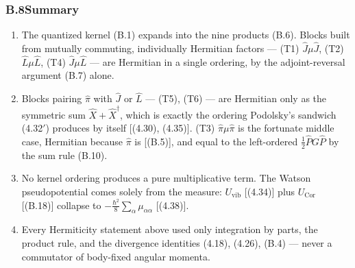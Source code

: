 \subsubsection*{B.8\quad Summary}

\begin{enumerate}
\item The quantized kernel (B.1) expands into the nine products (B.6). Blocks built from mutually commuting, individually Hermitian factors --- (T1) $\hat J\mu\hat J$, (T2) $\hat L\mu\hat L$, (T4) $\hat J\mu\hat L$ --- are Hermitian in a single ordering, by the adjoint-reversal argument (B.7) alone.
\item Blocks pairing $\hat\pi$ with $\hat J$ or $\hat L$ --- (T5), (T6) --- are Hermitian only as the symmetric sum $\hat X+\hat X^\dagger$, which is exactly the ordering Podolsky's sandwich (4.32$'$) produces by itself [(4.30), (4.35)]. (T3) $\hat\pi\mu\hat\pi$ is the fortunate middle case, Hermitian because $\hat\pi$ is [(B.5)], and equal to the left-ordered $\tfrac12\hat P G\hat P$ by the sum rule (B.10).
\item No kernel ordering produces a pure multiplicative term. The Watson pseudopotential comes solely from the measure: $U_{\mathrm{vib}}$ [(4.34)] plus $U_{\mathrm{Cor}}$ [(B.18)] collapse to $-\tfrac{\hbar^2}{8}\sum_\alpha\mu_{\alpha\alpha}$ [(4.38)].
\item Every Hermiticity statement above used only integration by parts, the product rule, and the divergence identities (4.18), (4.26), (B.4) --- never a commutator of body-fixed angular momenta.
\end{enumerate}
